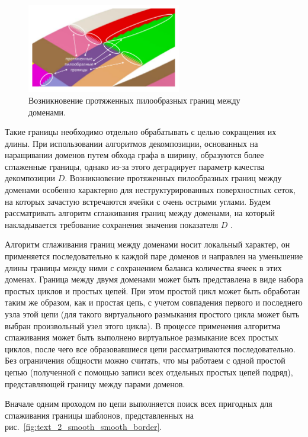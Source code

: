 \begin{figure}[ht]
\centering
\includegraphics[width=0.6\textwidth]{fig/par_bad-border.pdf}
\singlespacing
{}\caption{Возникновение протяженных пилообразных границ между доменами.}
\label{fig:text_2_smooth_bad_border}
\end{figure}

Такие границы необходимо отдельно обрабатывать с целью сокращения их длины.
При использовании алгоритмов декомпозиции, основанных на наращивании доменов путем обхода графа в ширину, образуются более сглаженные границы, однако из-за этого деградирует параметр качества декомпозиции $D$.
Возникновение протяженных пилообразных границ между доменами особенно характерно для неструктурированных поверхностных сеток, на которых зачастую встречаются ячейки с очень острыми углами.
Будем рассматривать алгоритм сглаживания границ между доменами, на который накладывается требование сохранения значения показателя $D$ \cite{Bagrov2021Smooth}.

Алгоритм сглаживания границ между доменами носит локальный характер, он применяется последовательно к каждой паре доменов и направлен на уменьшение длины границы между ними с сохранением баланса количества ячеек в этих доменах.
Граница между двумя доменами может быть представлена в виде набора простых циклов и простых цепей.
При этом простой цикл может быть обработан таким же образом, как и простая цепь, с учетом совпадения первого и последнего узла этой цепи (для такого виртуального размыкания простого цикла может быть выбран произвольный узел этого цикла).
В процессе применения алгоритма сглаживания может быть выполнено виртуальное размыкание всех простых циклов, после чего все образовавшиеся цепи рассматриваются последовательно.
Без ограничения общности можно считать, что мы работаем с одной простой цепью (полученной с помощью записи всех отдельных простых цепей подряд), представляющей границу между парами доменов.

Вначале одним проходом по цепи выполняется поиск всех пригодных для сглаживания границы шаблонов, представленных на рис.~\ref{fig:text_2_smooth_smooth_border}.

